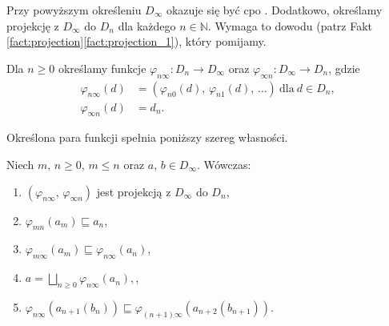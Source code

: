 Przy powyższym określeniu \(D_\infty\) okazuje się być cpo \cite[Tw. 16.36]{Hindley:2008:LCI:1388400}.
Dodatkowo, określamy projekcję z \(D_\infty\) do \(D_n\) dla każdego \(n\in\mathbb{N}\).
Wymaga to dowodu (patrz Fakt \ref{fact:projection}\ref{fact:projection_1}), który pomijamy.


\begin{definicja}%
Dla \(n\geq 0\) określamy funkcje \(\varphi_{n\infty}:D_n\to D_\infty\) oraz \(\varphi_{\infty n}: D_\infty \to D_n\), gdzie 
\begin{align*}
\varphi_{n\infty}(d) &= (\varphi_{n0}(d),\,\varphi_{n1}(d),\,\dots)\ \text{dla}\ d\in D_n,\\
\varphi_{\infty n}(d) &= d_n.
\end{align*}
\end{definicja}

Określona para funkcji spełnia poniższy szereg własności.

\begin{fakt}\label{fact:projection}%
Niech \(m,\,n\geq 0\), \(m\leq n\) oraz \(a,\,b\in D_\infty\). Wówczas:
\begin{enumerate}[label={(\roman*)}, ref={(\roman*)}] 
  \setlength\itemsep{0em}
  \item \((\varphi_{n\infty},\,\varphi_{\infty n})\) jest projekcją z \(D_\infty\) do \(D_n\),\label{fact:projection_1}
\item \(\varphi_{mn}(a_m)\sqsubseteq a_n\),\label{fact:projection_2}
\item \(\varphi_{m\infty}(a_m)\sqsubseteq \varphi_{n\infty}(a_n)\),\label{fact:projection_3}
\item \(a=\bigsqcup_{n\geq 0}\varphi_{n\infty}(a_n),\),\label{fact:projection_4}
\item \(\varphi_{n\infty}(a_{n+1}(b_n))\sqsubseteq\varphi_{(n+1)\infty}(a_{n+2}(b_{n+1}))\).\label{fact:projection_5}
\end{enumerate}
\end{fakt}

